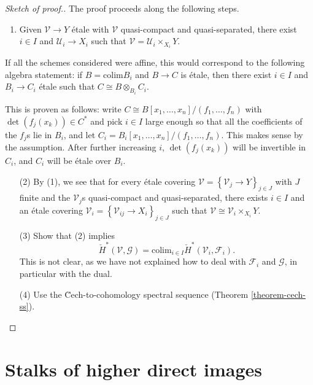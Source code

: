 \begin{proof}[Sketch of proof.]
The proof proceeds along the following steps.
\begin{enumerate}
\item Given $\mathcal{V}\to Y$ \'etale with $\mathcal{V}$ quasi-compact and
quasi-separated, there exist $i\in I$ and $\mathcal{U}_i \to X_i$ such that
$\mathcal{V} = \mathcal{U}_i \times_{X_i} Y$.
\end{enumerate}
If all the schemes considered were affine, this would correspond to the
following algebra statement: if $B=\text{colim} B_i$ and $B\to C$ is \'etale,
then there exist $i\in I$ and $B_i\to C_i$ \'etale such that $C \cong B
\otimes_{B_i} C_i$.

\medskip\noindent
This is proven as follows: write $C \cong B\left[x_1,\ldots, x_n\right]/(f_1,
\ldots, f_n)$ with $\det (f_j(x_k)) \in C^*$ and pick $i\in I$ large enough so
that all the coefficients of the $f_j$s lie in $B_i$, and let $C_i =
B_i\left[x_1, \ldots, x_n\right]/(f_1, \dots, f_n)$. This makes sense by the
assumption. After further increasing $i$, $\det (f_j(x_k))$ will be invertible
in $C_i$, and $C_i$ will be \'etale over $B_i$.
\begin{enumerate}
\item[(2)]
By (1), we see that for every \'etale covering $\mathcal{V} =
\left\{\mathcal{V}_j\to Y\right\}_{j\in J}$ with $J$ finite and the
$\mathcal{V}_j$s quasi-compact and quasi-separated, there exists $i\in I$ and
an \'etale covering $\mathcal{V}_i = \left\{\mathcal{V}_{ij} \to X_i
\right\}_{j\in J}$ such that $\mathcal{V} \cong \mathcal{V}_i\times_{X_i} Y$.
\item[(3)]
Show that (2) implies
$$
\check H^*(\mathcal{V}, \mathcal{G})=\text{colim}_{i\in I}\check
H^*(\mathcal{V}_i, \mathcal{F}_i).
$$
This is not clear, as we have not explained how to deal with $\mathcal{F}_i$
and $\mathcal{G}$, in particular with the dual.
\item[(4)] Use the \u Cech-to-cohomology spectral sequence
(Theorem \ref{theorem-cech-ss}).
\end{enumerate}
\end{proof}





\section{Stalks of higher direct images}
\label{section-stalks-direct-image}

